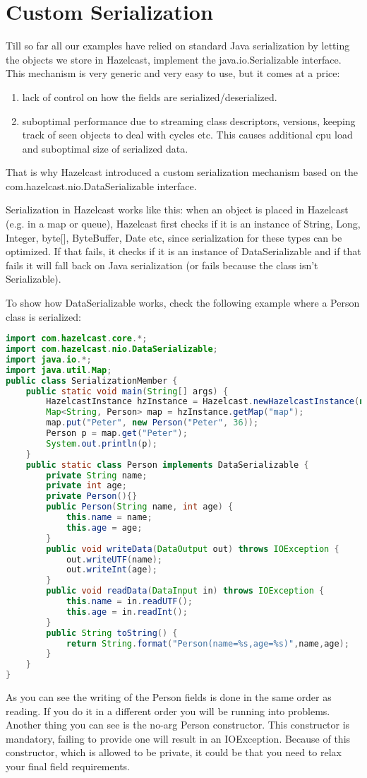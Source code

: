 \chapter{Custom Serialization}
Till so far all our examples have relied on standard Java serialization by letting the objects we store in Hazelcast, implement the java.io.Serializable interface. This mechanism is very generic and very easy to use, but it comes at a price:
\begin{enumerate}
\item lack of control on how the fields are serialized/deserialized.
\item suboptimal performance due to streaming class descriptors, versions, keeping track of seen objects to deal with cycles etc. This causes additional cpu load and suboptimal size of serialized data.
\end{enumerate}
That is why Hazelcast introduced a custom serialization mechanism based on the com.hazelcast.nio.DataSerializable interface. 

Serialization in Hazelcast works like this: when an object is placed in Hazelcast (e.g. in a map or queue), Hazelcast first checks if it is an instance of String, Long, Integer, byte[], ByteBuffer, Date etc, since serialization for these types can be optimized. If that fails, it checks if it is an instance of DataSerializable and if that fails it will fall back on Java serialization (or fails because the class isn't Serializable). 

To show how DataSerializable works, check the following example where a Person class is serialized:
\begin{lstlisting}[language=java]
import com.hazelcast.core.*;
import com.hazelcast.nio.DataSerializable;
import java.io.*;
import java.util.Map;
public class SerializationMember {
    public static void main(String[] args) {
        HazelcastInstance hzInstance = Hazelcast.newHazelcastInstance(null);
        Map<String, Person> map = hzInstance.getMap("map");
        map.put("Peter", new Person("Peter", 36));
        Person p = map.get("Peter");
        System.out.println(p);
    }
    public static class Person implements DataSerializable {
        private String name;
        private int age;
        private Person(){}
        public Person(String name, int age) {
            this.name = name;
            this.age = age;
        }
        public void writeData(DataOutput out) throws IOException {
            out.writeUTF(name);
            out.writeInt(age);
        }
        public void readData(DataInput in) throws IOException {
            this.name = in.readUTF();
            this.age = in.readInt();
        }
        public String toString() {
            return String.format("Person(name=%s,age=%s)",name,age);
        }
    }
}
\end{lstlisting}
As you can see the writing of the Person fields is done in the same order as reading. If you do it in a different order you will be running into problems. Another thing you can see is the no-arg Person constructor. This constructor is mandatory, failing to provide one will result in an IOException. Because of this constructor, which is allowed to be private, it could be that you need to relax your final field requirements.

